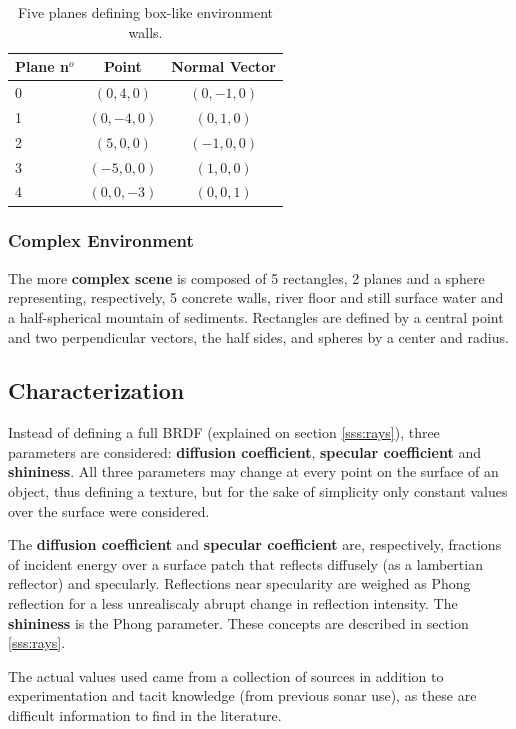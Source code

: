 \begin{table}[ht]
\centering
\begin{tabular}{lcc}
Plane n$^o$ & Point & Normal Vector \\
\hline
0 & $( 0, 4, 0)$ & $( 0,-1, 0)$  \\
1 & $( 0,-4, 0)$ & $( 0, 1, 0)$  \\
2 & $( 5, 0, 0)$ & $(-1, 0, 0)$  \\
3 & $(-5, 0, 0)$ & $( 1, 0, 0)$  \\
4 & $( 0, 0,-3)$ & $( 0, 0, 1)$  \\
\end{tabular}
\caption{Five planes defining box-like environment walls.}
\end{table}

\subsubsection{Complex Environment}
The more \textbf{complex scene} is composed of 5 rectangles, 2 planes and a sphere
representing, respectively, 5 concrete walls, river floor and still surface
water and a half-spherical mountain of sediments. Rectangles are defined by a
central point and two perpendicular vectors, the half sides, and spheres by a
center and radius.

\subsection{Characterization}
\label{ss:characterization}

Instead of defining a full BRDF (explained on section
\ref{sss:rays}), three parameters are considered: \textbf{diffusion coefficient},
\textbf{specular coefficient} and \textbf{shininess}. All three parameters may
change at every point on the surface of an object, thus defining a texture, but
for the sake of simplicity only constant values over the surface were
considered.

The \textbf{diffusion coefficient} and \textbf{specular coefficient} are,
respectively, fractions of incident energy over a surface patch that reflects
diffusely (as a lambertian reflector) and specularly. Reflections near
specularity are weighed as Phong reflection for a less unrealiscaly abrupt
change in reflection intensity. The \textbf{shininess} is the Phong parameter.
These concepts are described in section \ref{sss:rays}.

The actual values used came from a collection of sources in addition to
experimentation and tacit knowledge (from previous sonar use), as these are
difficult information to find in the literature.

